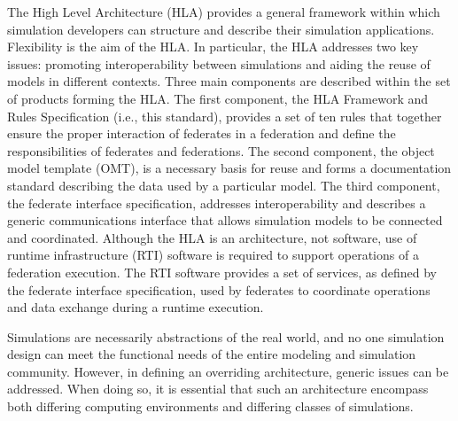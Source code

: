 \vspace{10.0pt}
The High Level Architecture (HLA) provides a general framework within which simulation developers can\linebreak
structure and describe their simulation applications. Flexibility is the aim of the HLA. In particular, the HLA\linebreak
addresses two key issues: promoting interoperability between simulations and aiding the reuse of models in\linebreak
different contexts. Three main components are described within the set of products forming the HLA. The\linebreak
first component, the HLA Framework and Rules Specification (i.e., this standard), provides a set of ten rules\linebreak
that together ensure the proper interaction of federates in a federation and define the responsibilities of\linebreak
federates and federations. The second component, the object model template (OMT), is a necessary basis for\linebreak
reuse and forms a documentation standard describing the data used by a particular model. The third\linebreak
component, the federate interface specification, addresses interoperability and describes a generic\linebreak
communications interface that allows simulation models to be connected and coordinated. Although the\linebreak
HLA is an architecture, not software, use of runtime infrastructure (RTI) software is required to support\linebreak
operations of a federation execution. The RTI software provides a set of services, as defined by the federate\linebreak
interface specification, used by federates to coordinate operations and data exchange during a runtime\linebreak
execution.\par

\vspace{10.0pt}
Simulations are necessarily abstractions of the real world, and no one simulation design can meet the\linebreak
functional needs of the entire modeling and simulation community. However, in defining an overriding\linebreak
architecture, generic issues can be addressed. When doing so, it is essential that such an architecture\linebreak
encompass both differing computing environments and differing classes of simulations.\par


